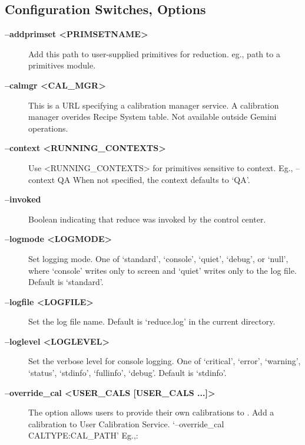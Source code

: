 \documentclass[letterpaper,10pt,english]{sphinxmanual}
\begin{document}
\subsection{Configuration Switches, Options}
\label{interfaces:configuration-switches-options}\begin{description}
\item[{\textbf{--addprimset \textless{}PRIMSETNAME\textgreater{}}}] \leavevmode
Add this path to user-supplied primitives for reduction. eg., path to a
primitives module.

\item[{\textbf{--calmgr \textless{}CAL\_MGR\textgreater{}}}] \leavevmode
This is a URL specifying a calibration manager service. A calibration manager
overides Recipe System table. Not available outside Gemini operations.

\item[{\textbf{--context \textless{}RUNNING\_CONTEXTS\textgreater{}}}] \leavevmode
Use \textless{}RUNNING\_CONTEXTS\textgreater{} for primitives sensitive to context. Eg., --context QA
When not specified, the context defaults to `QA'.

\item[{\textbf{--invoked}}] \leavevmode
Boolean indicating that reduce was invoked by the control center.

\item[{\textbf{--logmode \textless{}LOGMODE\textgreater{}}}] \leavevmode
Set logging mode. One of `standard', `console', `quiet', `debug', or `null',
where `console' writes only to screen and `quiet' writes only to the log
file. Default is `standard'.

\item[{\textbf{--logfile \textless{}LOGFILE\textgreater{}}}] \leavevmode
Set the log file name. Default is `reduce.log' in the current directory.

\item[{\textbf{--loglevel \textless{}LOGLEVEL\textgreater{}}}] \leavevmode
Set the verbose level for console logging. One of
`critical', `error', `warning', `status', `stdinfo', `fullinfo', `debug'.
Default is `stdinfo'.

\item[{\textbf{--override\_cal \textless{}USER\_CALS {[}USER\_CALS ...{]}\textgreater{}}}] \leavevmode
The option allows users to provide their own calibrations to .
Add a calibration to User Calibration Service.
`--override\_cal CALTYPE:CAL\_PATH'
Eg.,:
\begin{quote}


\end{quote}
\end{description}
\end{document}
